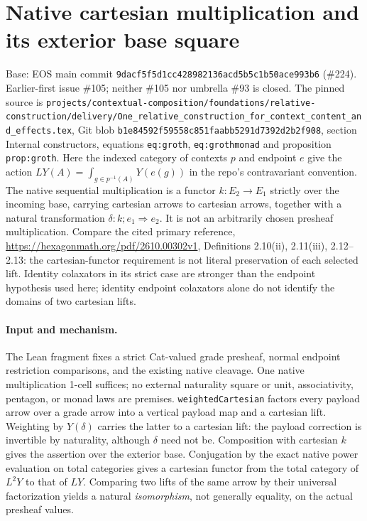 \documentclass{article}
\begin{document}
\section*{Native cartesian multiplication and its exterior base square}
Base: EOS main commit \texttt{9dacf5f5d1cc428982136acd5b5c1b50ace993b6} (\#224).
Earlier-first issue \#105; neither \#105 nor umbrella \#93 is closed.
The pinned source is \texttt{projects/contextual-composition/foundations/relative-construction/delivery/One\_relative\_construction\_for\_context\_content\_and\_effects.tex},
Git blob \texttt{b1e84592f59558c851faabb5291d7392d2b2f908}, section Internal constructors,
equations \texttt{eq:groth}, \texttt{eq:grothmonad} and proposition \texttt{prop:groth}.
Here the indexed category of contexts $p$ and endpoint $e$ give the action
$LY(A)=\int_{g\in p^{-1}(A)}Y(e(g))$ in the repo's contravariant convention.
The native sequential multiplication is a functor $k:E_2\to E_1$ strictly over the incoming base,
carrying cartesian arrows to cartesian arrows, together with a natural transformation
$\delta:k;e_1\Rightarrow e_2$. It is not an arbitrarily chosen presheaf multiplication.
Compare the cited primary reference, \url{https://hexagonmath.org/pdf/2610.00302v1},
Definitions 2.10(ii), 2.11(iii), 2.12--2.13: the cartesian-functor requirement is not literal
preservation of each selected lift. Identity colaxators in its strict case are stronger than the
endpoint hypothesis used here; identity endpoint colaxators alone do not identify the domains of
two cartesian lifts.
\paragraph{Input and mechanism.} The Lean fragment fixes a strict Cat-valued grade presheaf,
normal endpoint restriction comparisons, and the existing native cleavage. One native multiplication
1-cell suffices; no external naturality square or unit, associativity, pentagon, or monad laws are
premises. \texttt{weightedCartesian} factors every payload arrow over a grade arrow into a vertical
payload map and a cartesian lift. Weighting by $Y(\delta)$ carries the latter to a cartesian lift:
the payload correction is invertible by naturality, although $\delta$ need not be. Composition with
cartesian $k$ gives the assertion over the exterior base. Conjugation by the exact native
power evaluation on total categories gives a cartesian functor from the total category of $L^2Y$
to that of $LY$. Comparing two lifts of the same arrow by their universal factorization yields
a natural \emph{isomorphism}, not generally equality, on the actual presheaf values.
\end{document}
